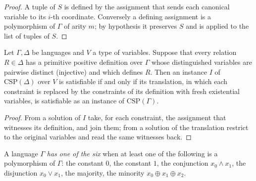 \begin{proof}
  \leanok
  A tuple of $S$ is defined by the assignment that sends each canonical variable to its $i$-th
  coordinate. Conversely a defining assignment is a polymorphism of $\Gamma$ of arity $m$; by
  hypothesis it preserves $S$ and is applied to the list of tuples of $S$.
\end{proof}

\begin{theorem}
  \label{thm:structure-traducir}
  \leanok
  Let $\Gamma, \Delta$ be languages and $V$ a type of variables. Suppose that every relation $R
  \in \Delta$ has a primitive positive definition over $\Gamma$ whose distinguished variables are
  pairwise distinct (injective) and which defines $R$. Then an instance $I$ of
  $\mathrm{CSP}(\Delta)$ over $V$ is satisfiable if and only if its translation, in which each
  constraint is replaced by the constraints of its definition with fresh existential variables, is
  satisfiable as an instance of $\mathrm{CSP}(\Gamma)$.
  \own{}
\end{theorem}

\begin{proof}
  \leanok
  From a solution of $I$ take, for each constraint, the assignment that witnesses its definition,
  and join them; from a solution of the translation restrict to the original variables and read
  the same witnesses back.
\end{proof}

\begin{definition}
  \label{def:structure-six}
  \leanok
  A language $\Gamma$ \emph{has one of the six} when at least one of the following is a
  polymorphism of $\Gamma$: the constant $0$, the constant $1$, the conjunction $x_0 \wedge x_1$,
  the disjunction $x_0 \vee x_1$, the majority, the minority $x_0 \oplus x_1 \oplus x_2$.
  \own{}
\end{definition}

